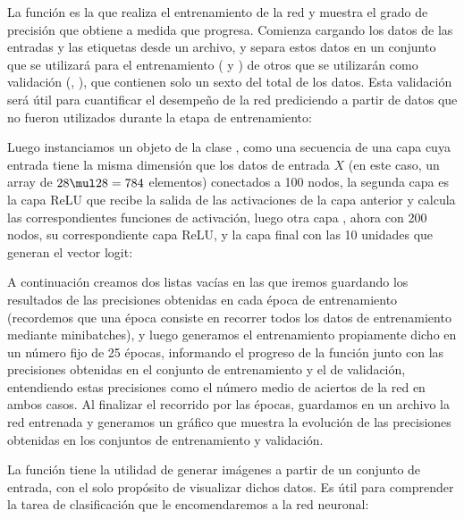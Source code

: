 
La función  es la que realiza el entrenamiento de la red y muestra el grado de precisión que obtiene a medida que progresa. Comienza cargando los datos de las entradas y las etiquetas desde un archivo, y separa estos datos en un conjunto que se utilizará para el entrenamiento ( y ) de otros que se utilizarán como validación (, ), que contienen solo un sexto del total de los datos. Esta validación será útil para cuantificar el desempeño de la red prediciendo a partir de datos que no fueron utilizados durante la etapa de entrenamiento:


Luego instanciamos un objeto de la clase , como una secuencia de una capa  cuya entrada tiene la misma dimensión que los datos de entrada $X$ (en este caso, un array de $28 \mul 28 = 784$ elementos) conectados a 100 nodos, la segunda capa es la capa ReLU que recibe la salida de las activaciones de la capa anterior y calcula las correspondientes funciones de activación, luego otra capa , ahora con 200 nodos, su correspondiente capa ReLU, y la capa final  con las 10 unidades que generan el vector logit:


A continuación creamos dos listas vacías en las que iremos guardando los resultados de las precisiones obtenidas en cada época de entrenamiento (recordemos que una época consiste en recorrer todos los datos de entrenamiento mediante minibatches), y luego generamos el entrenamiento propiamente dicho en un número fijo de 25 épocas, informando el progreso de la función junto con las precisiones obtenidas en el conjunto de entrenamiento y el de validación, entendiendo estas precisiones como el número medio de aciertos de la red en ambos casos. Al finalizar el recorrido por las épocas, guardamos en un archivo la red entrenada y generamos un gráfico que muestra la evolución de las precisiones obtenidas en los conjuntos de entrenamiento y validación.


La función  tiene la utilidad de generar imágenes a partir de un conjunto de entrada, con el solo propósito de visualizar dichos datos. Es útil para comprender la tarea de clasificación que le encomendaremos a la red neuronal:

